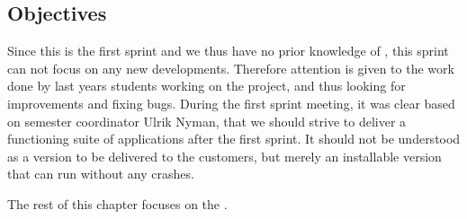 \subsection{Objectives}\label{sec:sprint1:objectives}
Since this is the first sprint and we thus have no prior knowledge of \giraf, this sprint can not focus on any new developments.
Therefore attention is given to the work done by last years students working on the project, and thus looking for improvements and fixing bugs.
During the first sprint meeting, it was clear based on semester coordinator Ulrik Nyman, that we should strive to deliver a functioning suite of applications after the first sprint.
It should not be understood as a version to be delivered to the customers, but merely an installable version that can run without any crashes. 

The rest of this chapter focuses on the \launcher.












